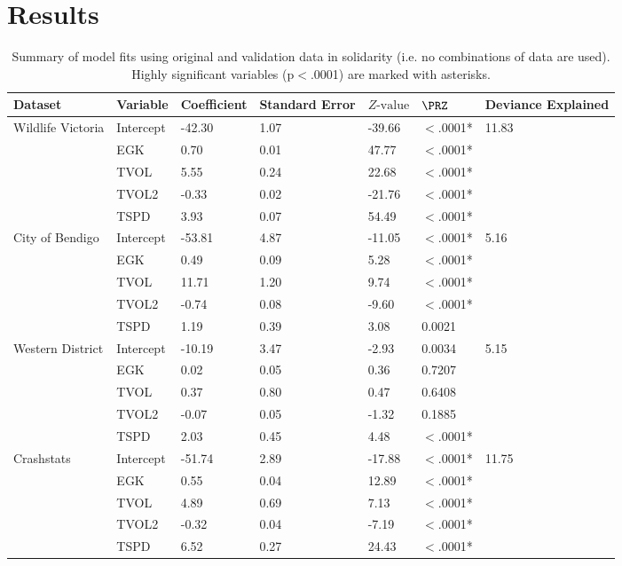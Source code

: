 \section{Results}

\begin{table}[htp]
\caption[Summary of model fits using original and validation data]{Summary of model fits using original and validation data in solidarity (i.e. no combinations of data are used). Highly significant variables (p$<$.0001) are marked with asterisks.}
\centering
\begin{tabularx}{0.9\textwidth}{lllllll} \toprule
Dataset & Variable & Coefficient & Standard Error & $Z\text{-value}$ & $\PRZ$ & Deviance Explained \\ 
  \midrule
Wildlife Victoria & Intercept & -42.30 & 1.07 & -39.66 & $<$.0001* & 11.83 \\ 
   & EGK & 0.70 & 0.01 & 47.77 & $<$.0001* &  \\ 
   & TVOL & 5.55 & 0.24 & 22.68 & $<$.0001* &  \\ 
   & TVOL2 & -0.33 & 0.02 & -21.76 & $<$.0001* &  \\ 
   & TSPD & 3.93 & 0.07 & 54.49 & $<$.0001* &  \\ 
  City of Bendigo & Intercept & -53.81 & 4.87 & -11.05 & $<$.0001* & 5.16 \\ 
   & EGK & 0.49 & 0.09 & 5.28 & $<$.0001* &  \\ 
   & TVOL & 11.71 & 1.20 & 9.74 & $<$.0001* &  \\ 
   & TVOL2 & -0.74 & 0.08 & -9.60 & $<$.0001* &  \\ 
   & TSPD & 1.19 & 0.39 & 3.08 & 0.0021 &  \\ 
  Western District & Intercept & -10.19 & 3.47 & -2.93 & 0.0034 & 5.15 \\ 
   & EGK & 0.02 & 0.05 & 0.36 & 0.7207 &  \\ 
   & TVOL & 0.37 & 0.80 & 0.47 & 0.6408 &  \\ 
   & TVOL2 & -0.07 & 0.05 & -1.32 & 0.1885 &  \\ 
   & TSPD & 2.03 & 0.45 & 4.48 & $<$.0001* &  \\ 
  Crashstats & Intercept & -51.74 & 2.89 & -17.88 & $<$.0001* & 11.75 \\ 
   & EGK & 0.55 & 0.04 & 12.89 & $<$.0001* &  \\ 
   & TVOL & 4.89 & 0.69 & 7.13 & $<$.0001* &  \\ 
   & TVOL2 & -0.32 & 0.04 & -7.19 & $<$.0001* &  \\ 
   & TSPD & 6.52 & 0.27 & 24.43 & $<$.0001* &  \\ 
\bottomrule
\end{tabularx}
\label{val_glm_perf}
\end{table}

